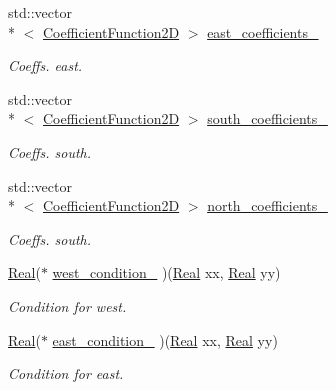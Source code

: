 \begin{DoxyCompactItemize}
std\+::vector\\*
$<$ \hyperlink{group__c07-mim__ops_gad9e1c0ace886b0029aefffa5f320e852}{Coefficient\+Function2\+D} $>$ \hyperlink{classmtk_1_1BCDescriptor2D_a1f90fc303984bf18c136a34896bbb7c9}{east\+\_\+coefficients\+\_\+}
\begin{DoxyCompactList}\small\item\em Coeffs. east. \end{DoxyCompactList}\item 
std\+::vector\\*
$<$ \hyperlink{group__c07-mim__ops_gad9e1c0ace886b0029aefffa5f320e852}{Coefficient\+Function2\+D} $>$ \hyperlink{classmtk_1_1BCDescriptor2D_a263309b9ad288dc89826d818d9378d07}{south\+\_\+coefficients\+\_\+}
\begin{DoxyCompactList}\small\item\em Coeffs. south. \end{DoxyCompactList}\item 
std\+::vector\\*
$<$ \hyperlink{group__c07-mim__ops_gad9e1c0ace886b0029aefffa5f320e852}{Coefficient\+Function2\+D} $>$ \hyperlink{classmtk_1_1BCDescriptor2D_a5429c040c034303dd92dcff554f9efad}{north\+\_\+coefficients\+\_\+}
\begin{DoxyCompactList}\small\item\em Coeffs. south. \end{DoxyCompactList}\item 
\hyperlink{group__c01-roots_gac080bbbf5cbb5502c9f00405f894857d}{Real}($\ast$ \hyperlink{classmtk_1_1BCDescriptor2D_a2d4af48b3408658c7ace6eeb74464c9f}{west\+\_\+condition\+\_\+} )(\hyperlink{group__c01-roots_gac080bbbf5cbb5502c9f00405f894857d}{Real} xx, \hyperlink{group__c01-roots_gac080bbbf5cbb5502c9f00405f894857d}{Real} yy)
\begin{DoxyCompactList}\small\item\em Condition for west. \end{DoxyCompactList}\item 
\hyperlink{group__c01-roots_gac080bbbf5cbb5502c9f00405f894857d}{Real}($\ast$ \hyperlink{classmtk_1_1BCDescriptor2D_a6cca0c70293203c9d88773e5d5f93418}{east\+\_\+condition\+\_\+} )(\hyperlink{group__c01-roots_gac080bbbf5cbb5502c9f00405f894857d}{Real} xx, \hyperlink{group__c01-roots_gac080bbbf5cbb5502c9f00405f894857d}{Real} yy)
\begin{DoxyCompactList}\small\item\em Condition for east. \end{DoxyCompactList}\item 

\end{DoxyCompactItemize}

